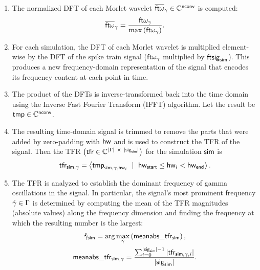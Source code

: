 \begin{enumerate}
    \item The normalized DFT of each Morlet wavelet $\overline{\mathsf{ft}\omega}_{\gamma} \in \mathbb{C}^{\mathsf{nconv}}$ is computed:
    \begin{equation}
        \overline{\mathsf{ft}\omega}_{\gamma} = 
        \frac{
            {\mathsf{ft}}{\omega_{\gamma}}
        }{
            \max \left(
                {\mathsf{ft}}{\omega_{\gamma}}
            \right)
        }.
    \end{equation}

    \item For each simulation, the DFT of each Morlet wavelet is multiplied element-wise by the DFT of the spike train signal ($\mathsf{ft}{\omega_{\gamma}}$ multiplied by $\mathsf{ft}\mathsf{sig}_{\mathsf{sim}}$). This produces a new frequency-domain representation of the signal that encodes its frequency content at each point in time.

    \item The product of the DFTs is inverse-transformed back into the time domain using the Inverse Fast Fourier Transform (IFFT) algorithm. Let the result be $\mathsf{tmp} \in \mathbb{C}^{\mathsf{nconv}}$.
    
    \item The resulting time-domain signal is trimmed to remove the parts that were added by zero-padding with $\mathsf{hw}$ and is used to construct the TFR of the signal. Then the TFR $\left( \mathsf{tfr} \in \mathbb{C}^{ |\Gamma| \ \times \ |\mathsf{sig}_{\mathsf{sim}}|} \right)$ for the simulation $\mathsf{sim}$ is
    \begin{equation}
        \tfr_{\tfrsimulation, \onegammafreq} 
        = 
        \left< 
            \tmp_{\tfrsimulation, \onegammafreq, \halfwave_i} 
            \ \mid \ 
            \halfwave_\substart \leq \halfwave_i < \halfwave_\subend
        \right>.
    \end{equation}
    
    \item The TFR is analyzed to establish the dominant frequency of gamma oscillations in the signal. In particular, the signal's most prominent frequency $\mathring{\gamma} \in \Gamma$ is determined by computing the mean of the TFR magnitudes (absolute values) along the frequency dimension and finding the frequency at which the resulting number is the largest:
    \begin{equation}
    \begin{gathered}
        \mathring{\gamma}_{\mathsf{sim}} = \arg \max_\gamma \left(
            \mathsf{meanabs}\_\mathsf{tfr}_{\mathsf{sim}}
        \right),
        \\
        \mathsf{meanabs}\_\mathsf{tfr}_{\mathsf{sim}, \gamma} = 
        \frac{
            \sum_{i=0}^{|\mathsf{sig}_{\mathsf{sim}}| - 1} 
            |\mathsf{tfr}_{\mathsf{sim}, \gamma, i}|
        }{
           |\mathsf{sig}_{\mathsf{sim}}|
        }.
    \end{gathered}
    \end{equation}
\end{enumerate}



